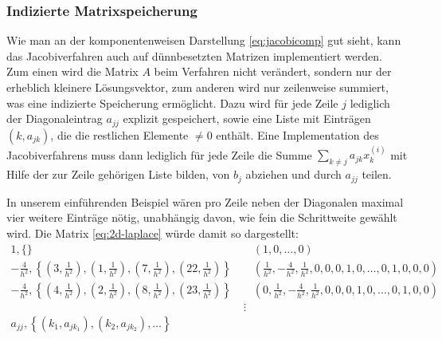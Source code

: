 \subsubsection{Indizierte Matrixspeicherung}

Wie man an der komponentenweisen Darstellung \eqref{eq:jacobicomp} gut
sieht, kann das Jacobiverfahren auch auf dünnbesetzten Matrizen
implementiert werden. Zum einen wird die Matrix $A$ beim Verfahren
nicht verändert, sondern nur der erheblich kleinere Lösungsvektor, zum
anderen wird nur zeilenweise summiert, was eine indizierte Speicherung
ermöglicht.  Dazu wird für jede Zeile $j$ lediglich der
Diagonaleintrag $a_{jj}$ explizit gespeichert, sowie eine Liste mit
Einträgen $(k, a_{jk})$, die die restlichen Elemente $\neq 0$
enthält. Eine Implementation des Jacobiverfahrens muss dann lediglich
für jede Zeile die Summe $\sum_{k\neq j} a_{jk}x_k^{(i)}$ mit
Hilfe der zur Zeile gehörigen Liste bilden, von $b_j$ abziehen und
durch $a_{jj}$ teilen.

In unserem einführenden Beispiel wären pro Zeile neben der Diagonalen
maximal vier weitere Einträge nötig, unabhängig davon, wie fein die
Schrittweite gewählt wird. Die Matrix \eqref{eq:2d-laplace} würde
damit so dargestellt:
{\small
  \begin{align}
    1, \{\} \;&\mathop{\widehat{=}}\; \left(1, 0, \ldots, 0\right)
    \nonumber\\
    -\frac{4}{h^2}, \left\{
      \left(3, \frac{1}{h^2}\right), \left(1, \frac{1}{h^2}\right),
      \left(7, \frac{1}{h^2}\right), \left(22, \frac{1}{h^2}\right)
    \right\}
    \;&\mathop{\widehat{=}}\;
    \left(\frac{1}{h^2}, -\frac{4}{h^2}, \frac{1}{h^2}, 0, 0, 0, 1, 0,
      \ldots, 0, 1, 0, 0, 0\right)\nonumber\\
    -\frac{4}{h^2}, \left\{
      \left(4, \frac{1}{h^2}\right), \left(2, \frac{1}{h^2}\right),
      \left(8, \frac{1}{h^2}\right), \left(23, \frac{1}{h^2}\right)
    \right\}
    \;&\mathop{\widehat{=}}\;
    \left(0, \frac{1}{h^2}, -\frac{4}{h^2}, \frac{1}{h^2}, 0, 0, 0, 1, 0,
      \ldots, 0, 1, 0, 0\right)\nonumber\\
    &\vdots\\
    a_{jj}, \left\{(k_1, a_{jk_1}),(k_2, a_{jk_2}), \ldots\right\}
    \;&
  \end{align}}

\subsection{}

